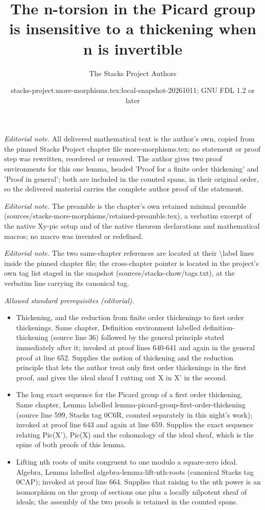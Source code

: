 \documentclass[10pt,a4paper]{amsart}
\title{The n-torsion in the Picard group is insensitive to a thickening when n is invertible}
\author{The Stacks Project Authors}
\date{stacks-project:more-morphisms.tex:local-snapshot-20261011; GNU FDL 1.2 or later}
\theoremstyle{plain}
\theoremstyle{definition}
\theoremstyle{remark}
\numberwithin{equation}{subsection}
\begin{document}
\maketitle
\noindent\textit{Editorial note.} All delivered mathematical text is the author's own, copied from the pinned Stacks Project chapter file more-morphisms.tex; no statement or proof step was rewritten, reordered or removed. The author gives two proof environments for this one lemma, headed 'Proof for a finite order thickening' and 'Proof in general'; both are included in the counted spans, in their original order, so the delivered material carries the complete author proof of the statement.\par\medskip
\noindent\textit{Editorial note.} The preamble is the chapter's own retained minimal preamble (sources/stacks-more-morphisms/retained-preamble.tex), a verbatim excerpt of the native Xy-pic setup and of the native theorem declarations and mathematical macros; no macro was invented or redefined.\par\medskip
\noindent\textit{Editorial note.} The two same-chapter references are located at their \textbackslash{}label lines inside the pinned chapter file; the cross-chapter pointer is located in the project's own tag list staged in the snapshot (sources/stacks-chow/tags.txt), at the verbatim line carrying its canonical tag.\par\medskip
\noindent\textit{Allowed standard prerequisites (editorial).}\begin{itemize}
\item Thickening, and the reduction from finite order thickenings to first order thickenings. Same chapter, Definition environment labelled definition-thickening (source line 36) followed by the general principle stated immediately after it; invoked at proof lines 640-641 and again in the general proof at line 652. Supplies the notion of thickening and the reduction principle that lets the author treat only first order thickenings in the first proof, and gives the ideal sheaf I cutting out X in X' in the second.
\item The long exact sequence for the Picard group of a first order thickening. Same chapter, Lemma labelled lemma-picard-group-first-order-thickening (source line 599, Stacks tag 0C6R, counted separately in this night's work); invoked at proof line 643 and again at line 659. Supplies the exact sequence relating Pic(X'), Pic(X) and the cohomology of the ideal sheaf, which is the spine of both proofs of this lemma.
\item Lifting nth roots of units congruent to one modulo a square-zero ideal. Algebra, Lemma labelled algebra-lemma-lift-nth-roots (canonical Stacks tag 0CAP); invoked at proof line 664. Supplies that raising to the nth power is an isomorphism on the group of sections one plus a locally nilpotent sheaf of ideals; the assembly of the two proofs is retained in the counted spans.
\end{itemize}\medskip
\end{document}
